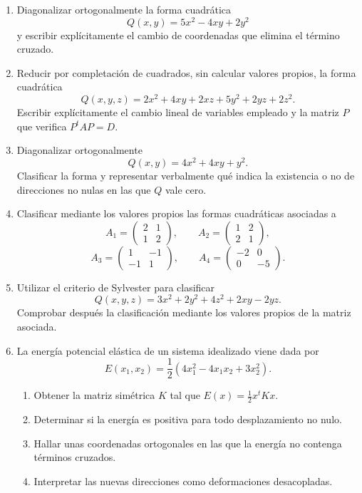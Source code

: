 \begin{enumerate}
\item Diagonalizar ortogonalmente la forma cuadrática
\[
Q(x,y)=5x^2-4xy+2y^2
\]
y escribir explícitamente el cambio de coordenadas que elimina el término cruzado.

\item Reducir por completación de cuadrados, sin calcular valores propios, la forma cuadrática
\[
Q(x,y,z)=2x^2+4xy+2xz+5y^2+2yz+2z^2.
\]
Escribir explícitamente el cambio lineal de variables empleado y la matriz $P$ que verifica $P^tAP=D$.

\item Diagonalizar ortogonalmente
\[
Q(x,y)=4x^2+4xy+y^2.
\]
Clasificar la forma y representar verbalmente qué indica la existencia o no de direcciones no nulas en las que $Q$ vale cero.

\item Clasificar mediante los valores propios las formas cuadráticas asociadas a
\[
A_1=\begin{pmatrix}2&1\\1&2\end{pmatrix},
\qquad
A_2=\begin{pmatrix}1&2\\2&1\end{pmatrix},
\]
\[
A_3=\begin{pmatrix}1&-1\\-1&1\end{pmatrix},
\qquad
A_4=\begin{pmatrix}-2&0\\0&-5\end{pmatrix}.
\]

\item Utilizar el criterio de Sylvester para clasificar
\[
Q(x,y,z)=3x^2+2y^2+4z^2+2xy-2yz.
\]
Comprobar después la clasificación mediante los valores propios de la matriz asociada.

\item La energía potencial elástica de un sistema idealizado viene dada por
\[
E(x_1,x_2)=\frac12\left(4x_1^2-4x_1x_2+3x_2^2\right).
\]
\begin{enumerate}[label=\alph*)]
\item Obtener la matriz simétrica $K$ tal que $E(x)=\frac12x^tKx$.
\item Determinar si la energía es positiva para todo desplazamiento no nulo.
\item Hallar unas coordenadas ortogonales en las que la energía no contenga términos cruzados.
\item Interpretar las nuevas direcciones como deformaciones desacopladas.
\end{enumerate}


\end{enumerate}
